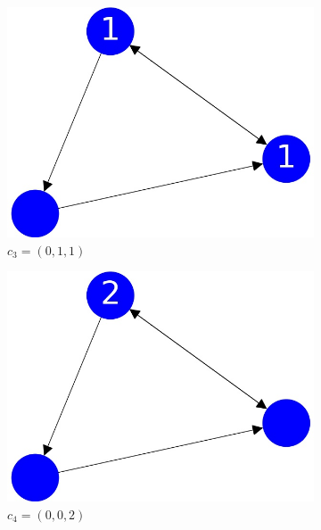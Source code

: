 \documentclass{beamer}
\begin{document}
\begin{frame}
\begin{figure}[h!]
  \centering
  \begin{subfigure}[b]{0.3\linewidth}
    \includegraphics[width=\linewidth]{sandpile_simple_3}
    \caption{$c_{3} = (0,1,1)$}
  \end{subfigure}
  \begin{subfigure}[b]{0.3\linewidth}
    \includegraphics[width=\linewidth]{sandpile_simple_4}
    \caption{$c_{4} = (0,0,2)$}
  \end{subfigure}
  \begin{subfigure}[b]{0.3\linewidth}

\end{subfigure}
\end{figure}
\end{frame}
\end{document}
